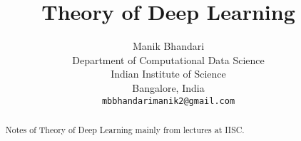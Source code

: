 \documentclass{article}
\title{Theory of Deep Learning}
\author{
	Manik Bhandari\\
	Department of Computational Data Science\\
	Indian Institute of Science\\
	Bangalore, India \\
	\texttt{mbbhandarimanik2@gmail.com} \\
}
\begin{document}
	
	\maketitle
	\begin{abstract}
		Notes of Theory of Deep Learning mainly from lectures at IISC.
	\end{abstract}
	


	
	
\end{document}

